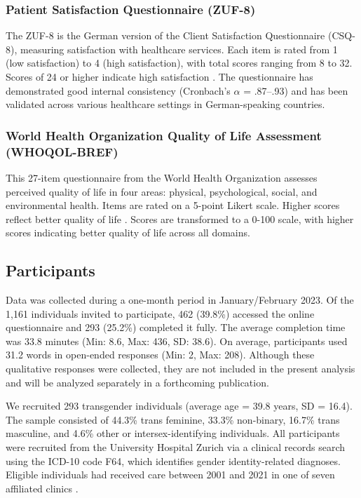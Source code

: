 \documentclass[12pt,a4paper]{article}
\begin{document}
\subsubsection{Patient Satisfaction Questionnaire (ZUF-8)}

The ZUF-8 is the German version of the Client Satisfaction Questionnaire (CSQ-8), measuring satisfaction with healthcare services. Each item is rated from 1 (low satisfaction) to 4 (high satisfaction), with total scores ranging from 8 to 32. Scores of 24 or higher indicate high satisfaction \parencite{Hannover2002}. The questionnaire has demonstrated good internal consistency (Cronbach's $\alpha$ = .87--.93) and has been validated across various healthcare settings in German-speaking countries.

\subsubsection{World Health Organization Quality of Life Assessment (WHOQOL-BREF)}

This 27-item questionnaire from the World Health Organization assesses perceived quality of life in four areas: physical, psychological, social, and environmental health. Items are rated on a 5-point Likert scale. Higher scores reflect better quality of life \parencite{Skevington2004}. Scores are transformed to a 0-100 scale, with higher scores indicating better quality of life across all domains.

\subsection{Participants}

Data was collected during a one-month period in January/February 2023. Of the 1,161 individuals invited to participate, 462 (39.8\%) accessed the online questionnaire and 293 (25.2\%) completed it fully. The average completion time was 33.8 minutes (Min: 8.6, Max: 436, SD: 38.6). On average, participants used 31.2 words in open-ended responses (Min: 2, Max: 208). Although these qualitative responses were collected, they are not included in the present analysis and will be analyzed separately in a forthcoming publication.

We recruited 293 transgender individuals (average age = 39.8 years, SD = 16.4). The sample consisted of 44.3\% trans feminine, 33.3\% non-binary, 16.7\% trans masculine, and 4.6\% other or intersex-identifying individuals. All participants were recruited from the University Hospital Zurich via a clinical records search using the ICD-10 code F64, which identifies gender identity-related diagnoses. Eligible individuals had received care between 2001 and 2021 in one of seven affiliated clinics \parencite{Richards2016}.
\end{document}
